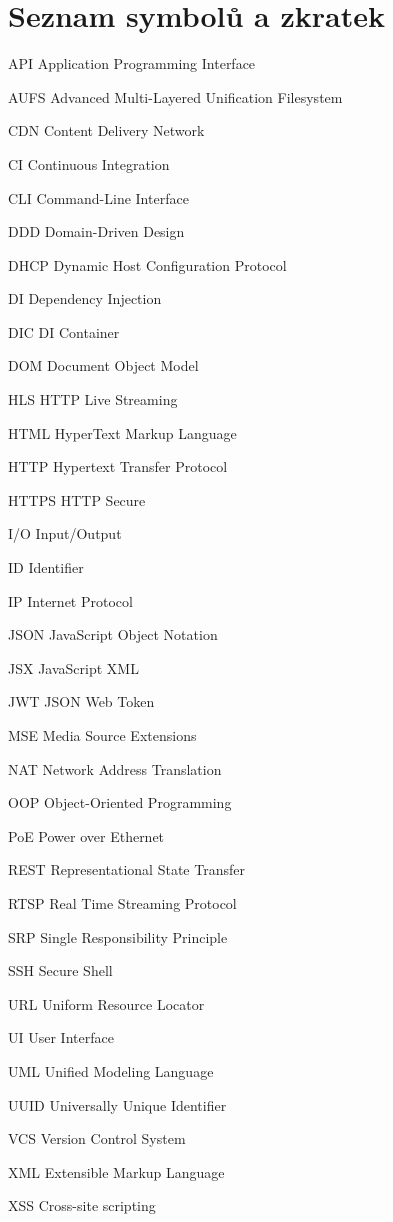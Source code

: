 \chapter*{Seznam symbolů a zkratek}
\noindent
\begin{abbreviations}
\item[API]		Application Programming Interface
\item[AUFS]		Advanced Multi-Layered Unification Filesystem
\item[CDN]		Content Delivery Network
\item[CI]		Continuous Integration
\item[CLI]		Command-Line Interface
\item[DDD]		Domain-Driven Design
\item[DHCP]		Dynamic Host Configuration Protocol
\item[DI]		Dependency Injection
\item[DIC]		DI Container
\item[DOM]		Document Object Model
\item[HLS]		HTTP Live Streaming
\item[HTML]		HyperText Markup Language
\item[HTTP]		Hypertext Transfer Protocol
\item[HTTPS]	HTTP Secure
\item[I/O]		Input/Output
\item[ID]		Identifier
\item[IP]		Internet Protocol
\item[JSON]		JavaScript Object Notation
\item[JSX]		JavaScript XML
\item[JWT]		JSON Web Token
\item[MSE]		Media Source Extensions
\item[NAT]		Network Address Translation
\item[OOP]		Object-Oriented Programming
\item[PoE]		Power over Ethernet
\item[REST]		Representational State Transfer
\item[RTSP]		Real Time Streaming Protocol
\item[SRP]		Single Responsibility Principle
\item[SSH]		Secure Shell
\item[URL]		Uniform Resource Locator
\item[UI]		User Interface
\item[UML]		Unified Modeling Language
\item[UUID]		Universally Unique Identifier
\item[VCS]		Version Control System
\item[XML]		Extensible Markup Language
\item[XSS]		Cross-site scripting
\end{abbreviations}
